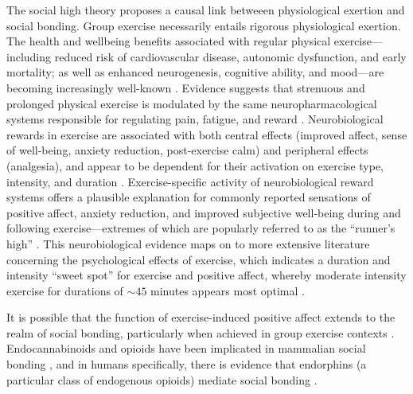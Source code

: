 \begin{CJK}{UTF8}{gbsn}
The social high theory proposes a causal link betweeen physiological exertion and social bonding.  Group exercise necessarily entails rigorous physiological exertion.
The health and wellbeing benefits associated with regular physical exercise---including reduced risk of cardiovascular disease, autonomic dysfunction, and early mortality; as well as enhanced neurogenesis, cognitive ability, and mood---are becoming increasingly well-known \citep{Blair1994,Nagamatsu2014}. Evidence suggests that strenuous and prolonged physical exercise is modulated by the same neuropharmacological systems responsible for regulating pain, fatigue, and reward \citep{Boecker2008,Raichlen2013}.  Neurobiological rewards in exercise are associated with both central effects (improved affect, sense of well-being, anxiety reduction, post-exercise calm) and peripheral effects (analgesia), and appear to be dependent for their activation on exercise type, intensity, and duration \citep{Dietrich2004}.  Exercise-specific activity of neurobiological reward systems offers a plausible explanation for commonly reported sensations of positive affect, anxiety reduction, and improved subjective well-being during and following exercise---extremes of which are popularly referred to as the ``runner's high'' \citep{Dietrich2004,Boecker2008,Raichlen2012}.  This neurobiological evidence maps on to more extensive literature concerning the psychological effects of exercise, which indicates a duration and intensity ``sweet spot'' for exercise and positive affect, whereby moderate intensity exercise for durations of $\sim45$ minutes appears most optimal \citep{Reed2006}.

It is possible that the function of exercise-induced positive affect extends to the realm of social bonding, particularly when achieved in group exercise contexts \citep{Cohen2009,Machin2011}.  Endocannabinoids and opioids have been implicated in mammalian social bonding \citep{Fattore2010,Keverne1989}, and in humans specifically, there is evidence that endorphins (a particular class of endogenous opioids) mediate social bonding \citep{Dunbar2012,Shultz2010}.


\end{CJK}
